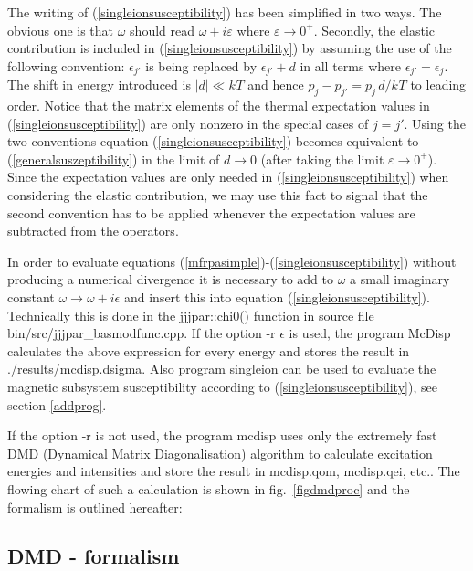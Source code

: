 The writing of (\ref{singleionsusceptibility}) has been simplified in two ways. The obvious
one is that $\omega$ should read $\omega+i \varepsilon$ where
$\varepsilon\to0^+$. Secondly, the elastic contribution is included
in (\ref{singleionsusceptibility}) by assuming the use of the following convention:
$\epsilon_{j'}$ is being replaced by $\epsilon_{j'}+d$ in all terms
where $\epsilon_{j'}=\epsilon_j$. The shift in energy introduced is
$|d|\ll k^{}T$ and hence
$p_j-p_{j'}=p_j\,d/k^{}T$ to leading order. Notice that
the matrix elements of the thermal expectation values in (\ref{singleionsusceptibility}) are
only nonzero in the special cases of $j=j'$. Using the two
conventions equation (\ref{singleionsusceptibility}) becomes 
equivalent to (\ref{generalsuszeptibility}) in the limit of
$d\to0$ (after taking the limit $\varepsilon\to0^+$).
Since the expectation values are only needed
in (\ref{singleionsusceptibility}) when considering the elastic contribution, we may use this
fact to signal that the second convention has to be applied whenever
the expectation values are subtracted from the operators.

In order to evaluate
 equations
(\ref{mfrpasimple})-(\ref{singleionsusceptibility}) without producing a numerical divergence 
it is necessary to add to $\omega$ a small imaginary constant $\omega \rightarrow \omega+i\epsilon$
and insert this into equation (\ref{singleionsusceptibility}). Technically this is done 
in the {\prg jjjpar::chi0()} function in source file {bin/src/jjjpar\_basmodfunc.cpp}.
If the option {\prg -r $\epsilon$} is used,
the program {\prg McDisp} calculates the above expression for every energy
and stores the result in {\prg ./results/mcdisp.dsigma}. 
Also program {\prg singleion} can be used
to evaluate the magnetic subsystem susceptibility according to (\ref{singleionsusceptibility}),
see section \ref{addprog}.

 If the option {\prg -r} is not used, the
 program {\prg mcdisp} uses only the extremely fast DMD (Dynamical Matrix Diagonalisation) %
algorithm\cite{rotter12-213201,rotter06-400} to calculate excitation energies and intensities and store the result in {\prg mcdisp.qom, %
mcdisp.qei, etc.}. 
The flowing chart of such a calculation is shown in fig.~\ref{figdmdproc}
and the formalism is outlined hereafter:


\subsection{DMD - formalism}\label{DMDform}

